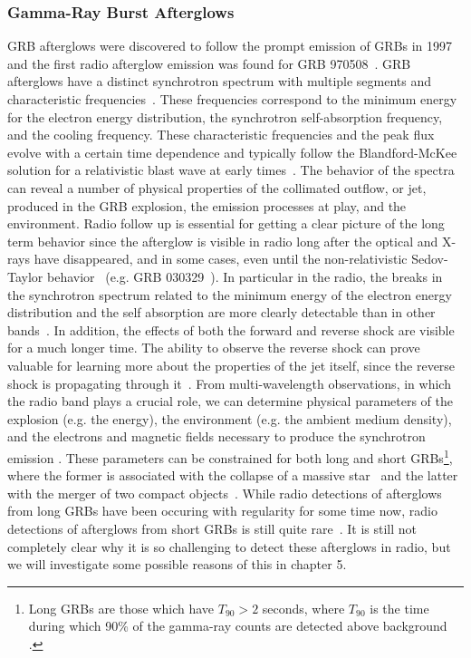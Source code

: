 \documentclass[12pt]{article}
\begin{document}
\subsubsection{Gamma-Ray Burst Afterglows}
GRB afterglows were discovered to follow the prompt emission of GRBs in 1997 and the first radio afterglow emission was found for GRB 970508~\citep{1997Natur.389..261F}. GRB afterglows have a distinct synchrotron spectrum with multiple segments and characteristic frequencies~\citep{1999ApJ...523..177W, 1998ApJ...497L..17S}. These frequencies correspond to the minimum energy for the electron energy distribution, the synchrotron self-absorption frequency, and the cooling frequency. These characteristic frequencies and the peak flux evolve with a certain time dependence and typically follow the Blandford-McKee solution for a relativistic blast wave at early times~\citep{1976PhFl...19.1130B}. The behavior of the spectra can reveal a number of physical properties of the collimated outflow, or jet, produced in the GRB explosion, the emission processes at play, and the environment. Radio follow up is essential for getting a clear picture of the long term behavior since the afterglow is visible in radio long after the optical and X-rays have disappeared, and in some cases, even until the non-relativistic Sedov-Taylor behavior~\citep{1959sadm.book.....S, doi:10.1098/rspa.1950.0050} (e.g. GRB 030329~\citet{2008A&A...480...35V}). In particular in the radio, the breaks in the synchrotron spectrum related to the minimum energy of the electron energy distribution and the self absorption are more clearly detectable than in other bands~\citep{2014PASA...31....8G}. In addition, the effects of both the forward and reverse shock are visible for a much longer time. The ability to observe the reverse shock can prove valuable for learning more about the properties of the jet itself, since the reverse shock is propagating through it~\citep{2014MNRAS.444.3151V, 2013ApJ...776..119L, 2014ApJ...781...37P}. From multi-wavelength observations, in which the radio band plays a crucial role, we can determine physical parameters of the explosion (e.g. the energy), the environment (e.g. the ambient medium density), and the electrons and magnetic fields necessary to produce the synchrotron emission \citep{2014PASA...31....8G}. These parameters can be constrained for both long and short GRBs\footnote{Long GRBs are those which have $T_{90}>2$ seconds, where $T_{90}$ is the time during which 90\% of the gamma-ray counts are detected above background \citep{1993ApJ...413L.101K}.}, where the former is associated with the collapse of a massive star~\citep{1998Natur.395..670G, 2003Natur.423..847H, 1993ApJ...405..273W} and the latter with the merger of two compact objects~\citep{1989Natur.340..126E, 1992ApJ...395L..83N, 2017PhRvL.119p1101A}. While radio detections of afterglows from long GRBs have been occuring with regularity for some time now, radio detections of afterglows from short GRBs is still quite rare~\citep{2015ApJ...815..102F}. It is still not completely clear why it is so challenging to detect these afterglows in radio, but we will investigate some possible reasons of this in chapter 5.
\end{document}
